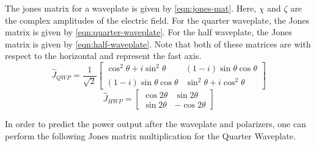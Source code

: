 \documentclass[aip, cp, amsmath, amssymb, reprint]{revtex4-2}
\begin{document}
        The jones matrix for a waveplate is given by \eqref{eqn:jones-mat}. Here, $\chi$ and $\zeta$ are the complex amplitudes of the electric field. For the quarter waveplate, the Jones matrix is given by \eqref{eqn:quarter-waveplate}. For the half waveplate, the Jones matrix is given by \eqref{eqn:half-waveplate}. Note that both of these matrices are with respect to the horizontal and represent the fast axis.
            \begin{equation} \label{eqn:quarter-waveplate}
                \hat{J}_{QWP} = \frac{1}{\sqrt{2}}\begin{bmatrix} \cos^2\theta+i\sin^2\theta & (1-i)\sin\theta\cos\theta \\ (1-i)\sin\theta\cos\theta & \sin^2\theta+i\cos^2\theta\end{bmatrix}
            \end{equation}
            \begin{equation} \label{eqn:half-waveplate}
                \hat{J}_{HWP} = \begin{bmatrix} \cos2\theta & \sin2\theta \\ \sin2\theta & -\cos2\theta\end{bmatrix}
            \end{equation}


        In order to predict the power output after the waveplate and polarizers, one can perform the following Jones matrix multiplication for the Quarter Waveplate.
\end{document}

